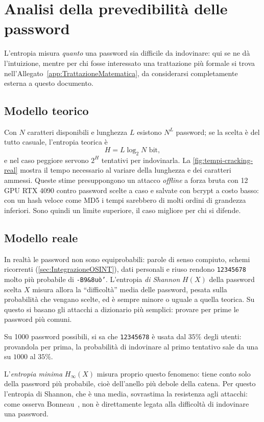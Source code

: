 \section{Analisi della prevedibilità delle password}\label{sec:Prevedibilita}

L'entropia misura \emph{quanto} una password sia difficile da indovinare: qui se ne dà l'intuizione, mentre per chi fosse interessato una trattazione più formale si trova nell'Allegato~\ref{app:TrattazioneMatematica}, da considerarsi completamente esterna a questo documento.
\subsection{Modello teorico}
Con \(N\) caratteri disponibili e lunghezza \(L\) esistono \(N^L\) password; se la scelta è del tutto casuale, l'entropia teorica è
\[
    H = L \log_2 N \text{ bit},
\]
e nel caso peggiore servono \(2^H\) tentativi per indovinarla.
La \cref{fig:tempi-cracking-real} mostra il tempo necessario al variare della lunghezza e dei caratteri ammessi.
Queste stime presuppongono un attacco \emph{offline} a forza bruta con 12 GPU RTX 4090 contro password scelte a caso e salvate con bcrypt a costo basso: con un hash veloce come MD5 i tempi sarebbero di molti ordini di grandezza inferiori. Sono quindi un limite superiore, il caso migliore per chi si difende.
\subsection{Modello reale}
In realtà le password non sono equiprobabili: parole di senso compiuto, schemi ricorrenti (\cref{sec:IntegrazioneOSINT}), dati personali e riuso rendono \texttt{12345678} molto più probabile di \texttt{-B9\&8uò'}.
L'entropia \emph{di Shannon} \(H(X)\) della password scelta \(X\) misura allora la ``difficoltà'' media delle password, pesata sulla probabilità che vengano scelte, ed è sempre minore o uguale a quella teorica.
Su questo si basano gli attacchi a dizionario più semplici: provare per prime le password più comuni.
\begin{example}\label{ex:password-comune}
    Su 1000 password possibili, si sa che \texttt{12345678} è usata dal \(35\%\) degli utenti: provandola per prima, la probabilità di indovinare al primo tentativo sale da una su $1000$ al $35\%$.
\end{example}
L'\emph{entropia minima} \(H_{\infty}(X)\) misura proprio questo fenomeno: tiene conto solo della password più probabile, cioè dell'anello più debole della catena. Per questo l'entropia di Shannon, che è una media, sovrastima la resistenza agli attacchi: come osserva Bonneau~\cite{bonneau2012}, non è direttamente legata alla difficoltà di indovinare una password.

